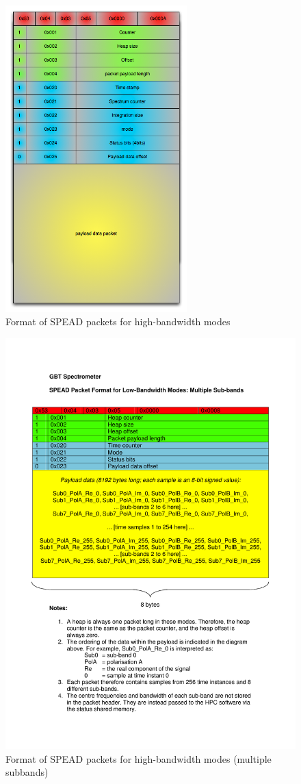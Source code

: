 \documentclass[11pt]{article} %
\begin{document}
\begin{figure}[!ht]
\centering
\includegraphics[width=7cm]{figures/spead_format_high_bandwidth.png}
\caption{Format of SPEAD packets for high-bandwidth modes}
\label{spead-hbw}
\end{figure}

\begin{figure}[!ht]
\centering
\includegraphics*[width=12cm, viewport = 50 291 540 705, page=1]{figures/spead_format_low_bandwidth.pdf}
\caption{Format of SPEAD packets for high-bandwidth modes (multiple subbands)}
\label{spead-lbw-multiple}
\end{figure}
\end{document}
